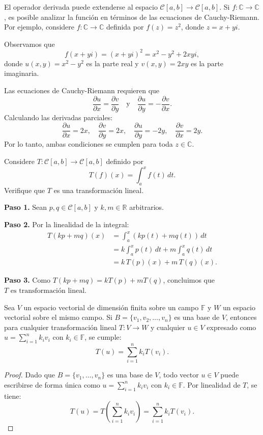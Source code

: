 \begin{rem}
El operador derivada puede extenderse al espacio $\mathcal{C}[a,b] \to \mathcal{C}[a,b]$. Si $f: \mathbb{C} \to \mathbb{C}$, es posible analizar la función en términos de las ecuaciones de Cauchy-Riemann. Por ejemplo, considere $f: \mathbb{C} \to \mathbb{C}$ definida por $f(z) = z^2$, donde $z = x + yi$.

Observamos que
\[
f(x+yi) = (x + yi)^2 = x^2 - y^2 + 2xyi,
\]
donde $u(x,y) = x^2 - y^2$ es la parte real y $v(x,y) = 2xy$ es la parte imaginaria.

Las ecuaciones de Cauchy-Riemann requieren que
\[
\frac{\partial u}{\partial x} = \frac{\partial v}{\partial y} \quad \text{y} \quad \frac{\partial u}{\partial y} = -\frac{\partial v}{\partial x}.
\]
Calculando las derivadas parciales:
\[
\frac{\partial u}{\partial x} = 2x, \quad \frac{\partial v}{\partial y} = 2x, \quad \frac{\partial u}{\partial y} = -2y, \quad \frac{\partial v}{\partial x} = 2y.
\]
Por lo tanto, ambas condiciones se cumplen para toda $z \in \mathbb{C}$.
\end{rem}

\begin{example}
Considere $T: \mathcal{C}[a,b] \to \mathcal{C}[a,b]$ definido por
\[
T(f)(x) = \int_a^x f(t)\,dt.
\]
Verifique que $T$ es una transformación lineal.
\begin{myproof}
\textbf{Paso 1.} Sean $p, q \in \mathcal{C}[a,b]$ y $k, m \in \mathbb{R}$ arbitrarios.

\textbf{Paso 2.} Por la linealidad de la integral:
\begin{align*}
    T(kp + m q)(x) &= \int_a^x (k p(t) + m q(t))\,dt \\
    &= k \int_a^x p(t)\,dt + m \int_a^x q(t)\,dt \\
    &= k\, T(p)(x) + m\, T(q)(x).
\end{align*}

\textbf{Paso 3.} Como $T(kp+mq) = kT(p) + mT(q)$, concluimos que $\boxed{T \text{ es transformación lineal}}$.
\end{myproof}
\end{example}


\begin{theorem}
Sea $V$ un espacio vectorial de dimensión finita sobre un campo $\mathbb{F}$ y $W$ un espacio vectorial sobre el mismo campo. Si $B = \{v_1, v_2, \ldots, v_n\}$ es una base de $V$, entonces para cualquier transformación lineal $T: V \to W$ y cualquier $u \in V$ expresado como $u = \sum_{i=1}^{n} k_i v_i$ con $k_i \in \mathbb{F}$, se cumple:
\[
T(u) = \sum_{i=1}^{n} k_i T(v_i).
\]
\begin{proof}
Dado que $B = \{v_1, \ldots, v_n\}$ es una base de $V$, todo vector $u \in V$ puede escribirse de forma única como $u = \sum_{i=1}^{n} k_i v_i$ con $k_i \in \mathbb{F}$. Por linealidad de $T$, se tiene:
\[
T(u) = T\left(\sum_{i=1}^{n} k_i v_i\right) = \sum_{i=1}^{n} k_i T(v_i).
\]
\end{proof}
\end{theorem}

